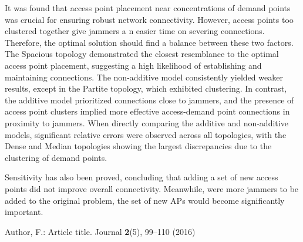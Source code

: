 \documentclass[runningheads]{llncs}
\begin{document}
	It was found that access point placement near concentrations of demand points was crucial for ensuring robust network connectivity. However, access points too clustered together give jammers a n easier time on severing connections. Therefore, the optimal solution should find a balance between these two factors. The Spacious topology demonstrated the closest resemblance to the optimal access point placement, suggesting a high likelihood of establishing and maintaining connections. The non-additive model consistently yielded weaker results, except in the Partite topology, which exhibited clustering. In contrast, the additive model prioritized connections close to jammers, and the presence of access point clusters implied more effective access-demand point connections in proximity to jammers. When directly comparing the additive and non-additive models, significant relative errors were observed across all topologies, with the Dense and Median topologies showing the largest discrepancies due to the clustering of demand points.
	
	Sensitivity has also been proved, concluding that adding a set of new access points did not improve overall connectivity. Meanwhile, were more jammers to be added to the original problem, the set of new APs would become significantly important.
	\begin{thebibliography}{8}
		Author, F.: Article title. Journal \textbf{2}(5), 99--110 (2016)
		
	\end{thebibliography}
\end{document}
